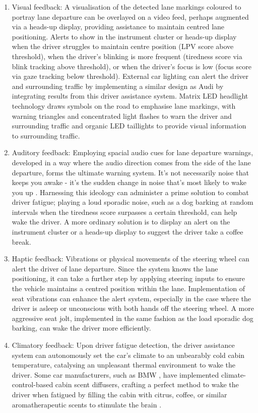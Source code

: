 \documentclass[9pt,conference]{IEEEtran}
\begin{document}
\begin{enumerate}[label=\alph*.]
    \item Visual feedback: A visualisation of the detected lane markings coloured to portray lane departure can be overlayed on a video feed, perhaps augmented via a heads-up display, providing assistance to maintain centred lane positioning. Alerts to show in the instrument cluster or heads-up display when the driver struggles to maintain centre position (LPV score above threshold), when the driver's blinking is more frequent (tiredness score via blink tracking above threshold), or when the driver's focus is low (focus score via gaze tracking below threshold). External car lighting can alert the driver and surrounding traffic by implementing a similar design as Audi \cite{b19} by integrating results from this driver assistance system. Matrix LED headlight technology draws symbols on the road to emphasise lane markings, with warning triangles and concentrated light flashes to warn the driver and surrounding traffic and organic LED taillights to provide visual information to surrounding traffic.
    \item Auditory feedback: Employing spacial audio cues for lane departure warnings, developed in a way where the audio direction comes from the side of the lane departure, forms the ultimate warning system. It's not necessarily noise that keeps you awake - it's the sudden change in noise that's most likely to wake you up \cite{b20}. Harnessing this ideology can administer a prime solution to combat driver fatigue; playing a loud sporadic noise, such as a dog barking at random intervals when the tiredness score surpasses a certain threshold, can help wake the driver. A more ordinary solution is to display an alert on the instrument cluster or a heads-up display to suggest the driver take a coffee break.
    \item Haptic feedback: Vibrations or physical movements of the steering wheel can alert the driver of lane departure. Since the system knows the lane positioning, it can take a further step by applying steering inputs to ensure the vehicle maintains a centred position within the lane. Implementation of seat vibrations can enhance the alert system, especially in the case where the driver is asleep or unconscious with both hands off the steering wheel. A more aggressive seat jolt, implemented in the same fashion as the load sporadic dog barking, can wake the driver more efficiently.
    \item Climatory feedback: Upon driver fatigue detection, the driver assistance system can autonomously set the car's climate to an unbearably cold cabin temperature, catalysing an unpleasant thermal environment to wake the driver. Some car manufacturers, such as BMW \cite{b21}, have implemented climate-control-based cabin scent diffusers, crafting a perfect method to wake the driver when fatigued by filling the cabin with citrus, coffee, or similar aromatherapeutic scents to stimulate the brain \cite{b22}.
\end{enumerate}
\end{document}
